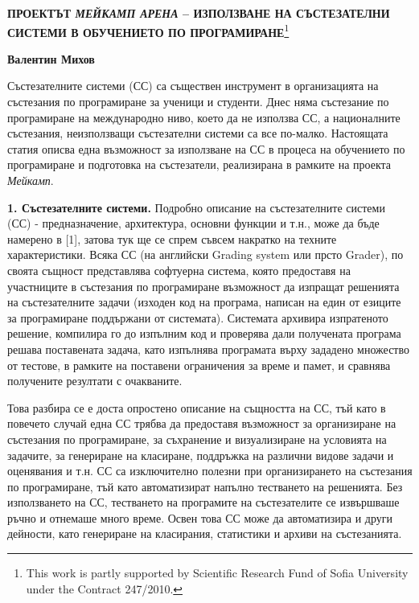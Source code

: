 \documentclass[11pt]{article}
\begin{document}
\textwidth 135mm
\textheight 194mm
\begin{center}
{\large \textbf{ПРОЕКТЪТ \textit{МЕЙКАМП АРЕНА} -- ИЗПОЛЗВАНЕ НА
СЪСТЕЗАТЕЛНИ СИСТЕМИ В ОБУЧЕНИЕТО ПО ПРОГРАМИРАНЕ}}\footnote{This
work is partly supported by Scientific Research Fund of Sofia
University under the Contract 247/2010.}

\vspace*{5mm}

\textbf{Валентин Михов}

\end {center}

\vspace*{5mm}
\parbox{11,7cm}{\footnotesize
Състезателните системи (СС) са съществен инструмент в
органи\-зацията на състезания по програмиране за ученици и студенти.
Днес няма състезание по програмиране на международно ниво, което да
не използва СС, а националните състезания, неизполз\-ващи
състезателни системи са все по-малко. Настоящата статия описва една
възможност за използване на СС в процеса на обучението по
програмиране и подготовка на състезатели, реализирана в рамките на
проекта \textit{Мейкамп}. }

\vspace*{5mm}

\textbf{1. Състезателните системи.} Подробно описание на
състезателните системи (СС) - предназначение, архитектура, основни
функции и т.н., може да бъде намерено в [1], затова тук ще се спрем
съвсем накратко на техните характеристики. Всяка СС (на английски
Grading system или прсто Grader), по своята същност представлява
софтуерна система, която предоставя на участниците в състезания по
програмиране възможност да изпращат решенията на състезателните
задачи (изходен код на програма, написан на един от езиците за
програмиране поддържани от системата). Системата архивира
изпратеното решение, компилира го до изпълним код и проверява дали
получената програма решава поставената задача, като изпълнява
програмата върху зададено множество от тестове, в рамките на
поставени ограничения за време и памет, и сравнява получените
резултати с очакваните.

Това разбира се е доста опростено описание на същността на СС, тъй
като в повечето случай една СС трябва да предоставя възможност за
организиране на състезания по програмиране, за съхранение и
визуализиране на условията на задачите, за генериране на класиране,
поддръжка на различни видове задачи и оценявания и т.н. СС са
изключително полезни при организирането на състезания по
програмиране, тъй като автоматизират напълно тестването на
решенията. Без използването на СС, тестването на програмите на
състезателите се извършваше ръчно и отнемаше много време. Освен това
СС може да автоматизира и други дейности, като генериране на
класирания, статистики и архиви на състезанията.
\end{document}
